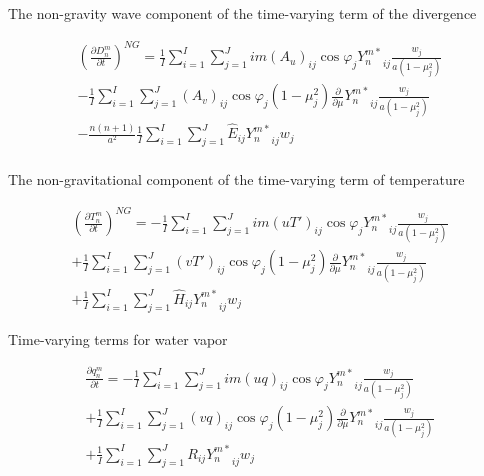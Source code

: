 The non-gravity wave component of the time-varying term of the
divergence

\begin{eqnarray}
  \left( \frac{\partial D_n^m}{\partial t} \right)^{NG}
   =  \frac{1}{I} \sum_{i=1}^{I} \sum_{j=1}^{J}  
          im (A_u)_{ij} \cos \varphi_j
          {Y_n^{m *}}_{ij}
         \frac{w_j}{a(1-\mu_j^{2})} 
          \\
   -    \frac{1}{I} \sum_{i=1}^{I} \sum_{j=1}^{J}  
          (A_v)_{ij} \cos \varphi_j
          (1-\mu_j^2) 
          \frac{\partial }{\partial \mu} {Y_n^{m *}}_{ij}
          \frac{w_j}{a(1-\mu_j^{2})} 
          \\
   -   \frac{n(n+1)}{a^{2}} 
         \frac{1}{I} \sum_{i=1}^{I} \sum_{j=1}^{J}  
          \hat{E}_{ij}  {Y_n^{m *}}_{ij} w_j
          \\ 
\end{eqnarray}

The non-gravitational component of the time-varying term of temperature

\begin{eqnarray}
  \left( \frac{\partial T_n^m}{\partial t} \right)^{NG}
   =  - \frac{1}{I} \sum_{i=1}^{I} \sum_{j=1}^{J}  
          im (u T')_{ij} \cos \varphi_j
          {Y_n^{m *}}_{ij}
         \frac{w_j}{a(1-\mu_j^{2})} 
          \\
     + \frac{1}{I} \sum_{i=1}^{I} \sum_{j=1}^{J}  
          (v T')_{ij} \cos \varphi_j
          (1-\mu_j^2) 
          \frac{\partial }{\partial \mu} {Y_n^{m *}}_{ij}
          \frac{w_j}{a(1-\mu_j^{2})} 
          \\
     + \frac{1}{I} \sum_{i=1}^{I} \sum_{j=1}^{J}  
          \hat{H}_{ij} 
          {Y_n^{m *}}_{ij} w_j
\end{eqnarray}

Time-varying terms for water vapor

\begin{eqnarray}
  \frac{\partial q_n^m}{\partial t}
   =  - \frac{1}{I} \sum_{i=1}^{I} \sum_{j=1}^{J}  
          im (uq)_{ij} \cos \varphi_j
          {Y_n^{m *}}_{ij}
         \frac{w_j}{a(1-\mu_j^{2})} 
          \\
     + \frac{1}{I} \sum_{i=1}^{I} \sum_{j=1}^{J}  
          (vq)_{ij} \cos \varphi_j
          (1-\mu_j^2) 
          \frac{\partial }{\partial \mu} {Y_n^{m *}}_{ij}
          \frac{w_j}{a(1-\mu_j^{2})} 
          \\
     + \frac{1}{I} \sum_{i=1}^{I} \sum_{j=1}^{J}  
          R_{ij} 
          {Y_n^{m *}}_{ij} w_j
\end{eqnarray}

